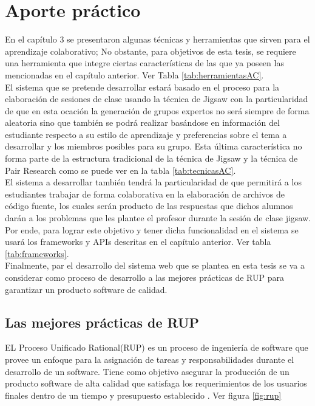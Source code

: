 \chapter{Aporte práctico}

En el capítulo 3 se presentaron algunas técnicas y herramientas que sirven para el aprendizaje colaborativo; No obstante, para objetivos de esta tesis, se requiere una herramienta que integre ciertas características de las que ya poseen las mencionadas en el capítulo anterior. Ver Tabla \ref{tab:herramientasAC}.\\

El sistema que se pretende desarrollar estará basado en el proceso para la elaboración de sesiones de clase usando la técnica de Jigsaw con la particularidad de que en esta ocación la generación de grupos expertos no será siempre de forma aleatoria sino que también se podrá realizar basándose en información del estudiante respecto a su estilo de aprendizaje y preferencias sobre el tema a desarrollar y los miembros posibles para su grupo. Esta última característica no forma parte de la estructura tradicional de la técnica de Jigsaw y la técnica de Pair Research como se puede ver en la tabla \ref{tab:tecnicasAC}.\\

El sistema a desarrollar también tendrá la particularidad de que permitirá a los estudiantes trabajar de forma colaborativa en la elaboración de archivos de código fuente, los cuales serán producto de las respuestas que dichos alumnos darán a los problemas que les plantee el profesor durante la sesión de clase jigsaw. Por ende, para lograr este objetivo y tener dicha funcionalidad en el sistema se usará los frameworks y APIs descritas en el capítulo anterior. Ver tabla \ref{tab:frameworks}.\\

Finalmente, par el desarrollo del sistema web que se plantea en esta tesis se va a considerar como proceso de desarrollo a las mejores prácticas de RUP para garantizar un producto software de calidad.


\section{Las mejores prácticas de RUP}
EL Proceso Unificado Rational(RUP) es un proceso de ingeniería de software que provee un enfoque para la asignación de tareas y responsabilidades durante el desarrollo de un software. Tiene como objetivo asegurar la producción de un producto software de alta calidad que satisfaga los requerimientos de los usuarios finales dentro de un tiempo y presupuesto establecido \cite{rup_ibm_2014}. Ver figura \ref{fig:rup}\\

